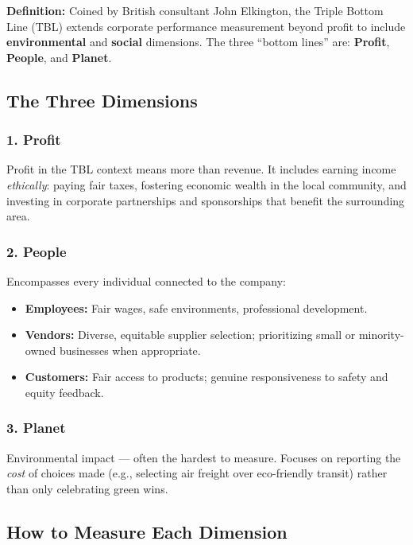 \documentclass[11pt, letterpaper]{article}
\begin{document}
\begin{defbox}
\textbf{Definition:} Coined by British consultant John Elkington, the Triple Bottom Line (TBL) extends corporate performance measurement beyond profit to include \textbf{environmental} and \textbf{social} dimensions. The three ``bottom lines'' are: \textbf{Profit}, \textbf{People}, and \textbf{Planet}.
\end{defbox}

\subsection{The Three Dimensions}

\subsubsection{1. Profit}
Profit in the TBL context means more than revenue. It includes earning income \textit{ethically}: paying fair taxes, fostering economic wealth in the local community, and investing in corporate partnerships and sponsorships that benefit the surrounding area.

\subsubsection{2. People}
Encompasses every individual connected to the company:
\begin{itemize}[leftmargin=*]
  \item \textbf{Employees:} Fair wages, safe environments, professional development.
  \item \textbf{Vendors:} Diverse, equitable supplier selection; prioritizing small or minority-owned businesses when appropriate.
  \item \textbf{Customers:} Fair access to products; genuine responsiveness to safety and equity feedback.
\end{itemize}

\subsubsection{3. Planet}
Environmental impact --- often the hardest to measure. Focuses on reporting the \textit{cost} of choices made (e.g., selecting air freight over eco-friendly transit) rather than only celebrating green wins.

\subsection{How to Measure Each Dimension}
\end{document}
